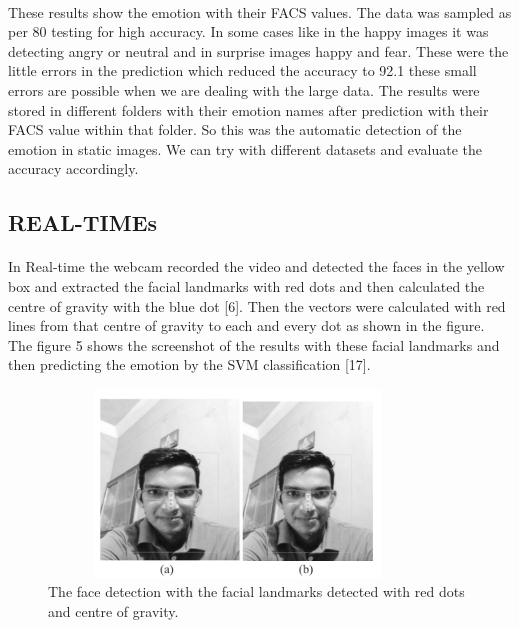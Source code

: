 \documentclass[a4paper,12pt,oneside]{article}
\begin{document}
\paragraph{}
These results show the emotion with their FACS values.
The data was sampled as per 80%
testing for high accuracy. In some cases like in the happy
images it was detecting angry or neutral and in surprise
images happy and fear. These were the little errors in the
prediction which reduced the accuracy to 92.1%
these small errors are possible when we are dealing with
the large data. The results were stored in different folders
with their emotion names after prediction with their
FACS value within that folder. So this was the automatic
detection of the emotion in static images. We can try
with different datasets and evaluate the accuracy
accordingly.

\subsection{REAL-TIMEs}
\paragraph{}
In Real-time the webcam recorded the video and
detected the faces in the yellow box and extracted the
facial landmarks with red dots and then calculated the
centre of gravity with the blue dot [6]. Then the vectors
were calculated with red lines from that centre of gravity
to each and every dot as shown in the figure. The figure
5 shows the screenshot of the results with these facial
landmarks and then predicting the emotion by the SVM
classification [17].

\begin{figure}[H]
\centering
\includegraphics[height=5cm,width=10cm]{realtime1.jpg}
\caption{The face detection with the facial
landmarks detected with red dots and centre of gravity.}
\end{figure}
\end{document}
